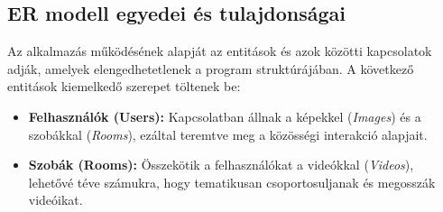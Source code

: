 \subsection{ER modell egyedei és tulajdonságai}
Az alkalmazás működésének alapját az entitások és azok közötti kapcsolatok adják, amelyek elengedhetetlenek a program struktúrájában. A következő entitások kiemelkedő szerepet töltenek be:

\begin{itemize}
    \item \textbf{Felhasználók (Users):} Kapcsolatban állnak a képekkel (\textit{Images}) és a szobákkal (\textit{Rooms}), ezáltal teremtve meg a közösségi interakció alapjait.
    \item \textbf{Szobák (Rooms):} Összekötik a felhasználókat a videókkal (\textit{Videos}), lehetővé téve számukra, hogy tematikusan csoportosuljanak és megosszák videóikat.
\end{itemize}

